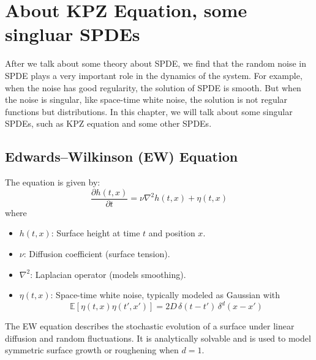 \chapter{About KPZ Equation, some singluar SPDEs}
After we talk about some theory about SPDE, we find that the random noise in SPDE plays a very important role in the dynamics of the system. For example, when the noise has good regularity, the solution of SPDE is smooth. But when the noise is singular, like space-time white noise, the solution is not regular functions but distributions. In this chapter, we will talk about some singular SPDEs, such as KPZ equation and some other SPDEs\cite{kardar1986dynamic}.
 

\section{Edwards–Wilkinson (EW) Equation}
The equation is given by:
\[
\frac{\partial h(t,x)}{\partial t} = \nu \nabla^2 h(t,x) + \eta(t,x)
\]
where 
\begin{itemize}
    \item $h(t,x)$: Surface height at time $t$ and position $x$.
    \item $\nu$: Diffusion coefficient (surface tension).
    \item $\nabla^2$: Laplacian operator (models smoothing).
    \item $\eta(t,x)$: Space-time white noise, typically modeled as Gaussian with
    \[
    \mathbb{E}[\eta(t,x)\eta(t',x')] = 2D\,\delta(t - t')\,\delta^d(x - x')
    \]
\end{itemize}

\begin{theorem}
    The EW equation describes the stochastic evolution of a surface under linear diffusion and random fluctuations. It is analytically solvable and is used to model symmetric surface growth or roughening when $d=1$. 
\end{theorem}

